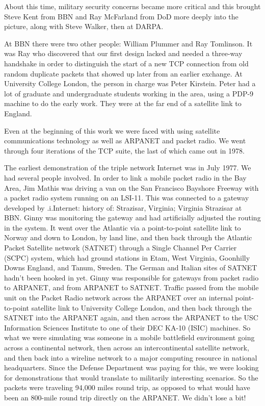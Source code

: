 \documentclass[10pt,a4paper]{scrartcl}
\begin{document}
About this time, military security concerns became more critical and this brought Steve Kent from BBN and Ray McFarland from DoD more deeply into the picture, along with Steve Walker, then at DARPA.

At BBN there were two other people: William Plummer and Ray Tomlinson. It was Ray who discovered that our first design lacked and needed a three-way handshake in order to distinguish the start of a new TCP connection from old random duplicate packets that showed up later from an earlier exchange. At University College London, the person in charge was Peter Kirstein. Peter had a lot of graduate and undergraduate students working in the area, using a PDP-9 machine to do the early work. They were at the far end of a satellite link to England.

Even at the beginning of this work we were faced with using satellite communications technology as well as ARPANET and packet radio. We went through four iterations of the TCP suite, the last of which came out in 1978.

The earliest demonstration of the triple network Internet was in July 1977. We had several people involved. In order to link a mobile packet radio in the Bay Area, Jim Mathis was driving a van on the San Francisco Bayshore Freeway with a packet radio system running on an LSI-11. This was connected to a gateway developed by .i.Internet: history of: Strazisar, Virginia; Virginia Strazisar at BBN. Ginny was monitoring the gateway and had artificially adjusted the routing in the system. It went over the Atlantic via a point-to-point satellite link to Norway and down to London, by land line, and then back through the Atlantic Packet Satellite network (SATNET) through a Single Channel Per Carrier (SCPC) system, which had ground stations in Etam, West Virginia, Goonhilly Downs England, and Tanum, Sweden. The German and Italian sites of SATNET hadn't been hooked in yet. Ginny was responsible for gateways from packet radio to ARPANET, and from ARPANET to SATNET. Traffic passed from the mobile unit on the Packet Radio network across the ARPANET over an internal point-to-point satellite link to University College London, and then back through the SATNET into the ARPANET again, and then across the ARPANET to the USC Information Sciences Institute to one of their DEC KA-10 (ISIC) machines. So what we were simulating was someone in a mobile battlefield environment going across a continental network, then across an intercontinental satellite network, and then back into a wireline network to a major computing resource in national headquarters. Since the Defense Department was paying for this, we were looking for demonstrations that would translate to militarily interesting scenarios. So the packets were traveling 94,000 miles round trip, as opposed to what would have been an 800-mile round trip directly on the ARPANET. We didn't lose a bit!
\end{document}
